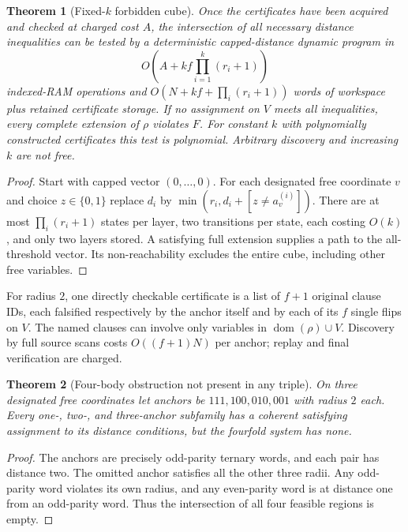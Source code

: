 \documentclass[10pt]{article}
\newtheorem{theorem}{Theorem}
\begin{document}
\begin{theorem}[Fixed-$k$ forbidden cube]
Once the certificates have been acquired and checked at charged cost $A$,
the intersection of all necessary distance inequalities can be tested
by a deterministic capped-distance dynamic program in
\[
O(A+kf\prod_{i=1}^k(r_i+1))
\]
indexed-RAM operations and $O(N+kf+\prod_i(r_i+1))$ words of workspace
plus retained certificate storage. If no assignment on $V$ meets all
inequalities, \emph{every} complete extension of $\rho$ violates $F$.
For constant $k$ with polynomially constructed certificates this test
is polynomial. Arbitrary discovery and increasing $k$ are not free.
\end{theorem}
\begin{proof}
Start with capped vector $(0,\ldots,0)$. For each designated free
coordinate $v$ and choice $z\in\{0,1\}$ replace
$d_i$ by $\min(r_i,d_i+[z\ne a^{(i)}_v])$.
There are at most $\prod_i(r_i+1)$ states per layer, two
transitions per state, each costing $O(k)$, and only two layers stored.
A satisfying full extension supplies a path to the all-threshold vector.
Its non-reachability excludes the entire cube, including other free variables.
\end{proof}

For radius $2$, one directly checkable certificate is a list of $f+1$
original clause IDs, each falsified respectively by the anchor itself
and by each of its $f$ single flips on $V$. The named clauses can involve
only variables in $\operatorname{dom}(\rho)\cup V$. Discovery by full source
scans costs $O((f+1)N)$ per anchor; replay and final verification are charged.

\begin{theorem}[Four-body obstruction not present in any triple]
On three designated free coordinates let anchors be
$111,100,010,001$ with radius $2$ each. Every one-, two-, and
three-anchor subfamily has a coherent satisfying assignment to its
distance conditions, but the fourfold system has none.
\end{theorem}
\begin{proof}
The anchors are precisely odd-parity ternary words, and each pair has
distance two. The omitted anchor satisfies all the other three radii.
Any odd-parity word violates its own radius, and any even-parity
word is at distance one from an odd-parity word. Thus the intersection
of all four feasible regions is empty.
\end{proof}
\end{document}
